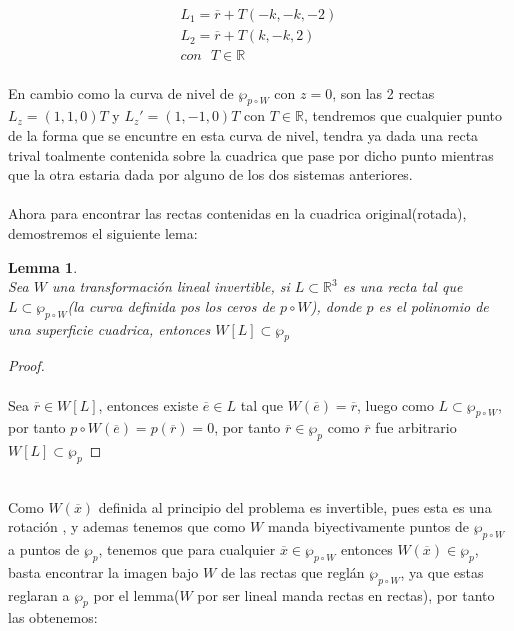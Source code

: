 \documentclass[11pt,letterpaper]{article}
\newtheorem{lemma}[theorem]{Lemma}
\newcommand{\R}{\mathbb{R}}
\begin{document}
        \begin{align*}
            L_1=\overline{r}+T(-k,-k,-2)\,\\
            L_2=\overline{r}+T(k,-k,2)\,\\
            con\,\,\,\,T\in \R
        \end{align*}\,\\
        En cambio como la curva de nivel de $\wp_{p\circ W}$ con $z=0$, son las 2 rectas $L_z=(1,1,0)T$ y $L_{z}'=(1,-1,0)T$ con $T\in \R$, tendremos que cualquier punto
        de la forma que se encuntre en esta curva de nivel, tendra ya dada una recta trival toalmente contenida sobre la cuadrica que pase por dicho punto
        mientras que la otra estaria dada por alguno de los dos sistemas anteriores.\,\\
        \,\\
        Ahora para encontrar las rectas contenidas en la cuadrica original(rotada), demostremos el siguiente lema:\,\\
        \begin{lemma}\,\\
            Sea $W$ una transformaci\'on lineal invertible, si $L\subset \R^3$ es una recta tal que $L\subset \wp_{p\circ W}$(la curva definida pos los ceros de $p\circ W$), donde $p$ es el polinomio de una superficie cuadrica, entonces $W[L]\subset \wp_{p}$ 
        \end{lemma}
        \begin{proof}\,\\
            \,\\
            Sea $\overline{r}\in W[L]$, entonces existe $\overline{e}\in L$ tal que $W(\overline{e})=\overline{r}$, luego como $L\subset\wp_{ p\circ W}$, por tanto $p\circ W(\overline{e})=p(\overline{r})=0$, por tanto
            $\overline{r}\in \wp_{p}$ como $\overline r$ fue arbitrario $W[L]\subset \wp_{p}$
        \end{proof}\,\\
        Como $W(\overline{x})$ definida al principio del problema es invertible, pues esta es una rotaci\'on , y ademas tenemos que como $W$ manda biyectivamente puntos de $\wp_{p\circ W}$ a puntos de $\wp_{p}$, tenemos que para cualquier $\overline{x}\in \wp_{p\circ W}$ entonces
        $W(\overline{x})\in \wp_{p}$, basta encontrar la imagen bajo $W$ de las rectas que regl\'an $\wp_{p\circ W}$, ya que estas reglaran a $\wp_{p}$ por el lemma($W$ por ser lineal manda rectas en rectas), por tanto las obtenemos:\,\\
        \,\\
\end{document}
